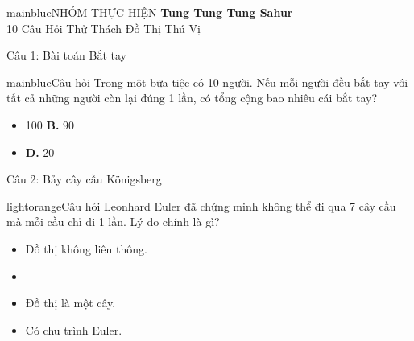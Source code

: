 \documentclass[10pt, xcolor={dvipsnames}]{beamer}
\begin{document}
\begin{frame}[plain]
    \centering
    \vspace{0.4cm}
    \begin{gamebox}{mainblue}{NHÓM THỰC HIỆN}
        \centering \Large \textbf{Tung Tung Tung Sahur} \\
        \vspace{0.2cm}
        \small 10 Câu Hỏi Thử Thách Đồ Thị Thú Vị
    \end{gamebox}
\end{frame}

\begin{frame}{Câu 1: Bài toán Bắt tay}
    \begin{gamebox}{mainblue}{Câu hỏi}
        Trong một bữa tiệc có 10 người. Nếu mỗi người đều bắt tay với tất cả những người còn lại đúng 1 lần, có tổng cộng bao nhiêu cái bắt tay?
    \end{gamebox}
    \begin{itemize}
        \item[\textbf{A.}] 100 \quad \quad \quad \quad \textbf{B.} 90
        \item[\textbf{C.}]  \quad \quad \textbf{D.} 20
    \end{itemize}
\end{frame}

\begin{frame}{Câu 2: Bảy cây cầu Königsberg}
    \begin{gamebox}{lightorange}{Câu hỏi}
        Leonhard Euler đã chứng minh không thể đi qua 7 cây cầu mà mỗi cầu chỉ đi 1 lần. Lý do chính là gì?
    \end{gamebox}
    \begin{itemize}
        \item[\textbf{A.}] Đồ thị không liên thông.
        \item[\textbf{B.}] 
        \item[\textbf{C.}] Đồ thị là một cây.
        \item[\textbf{D.}] Có chu trình Euler.
    \end{itemize}
\end{frame}
\end{document}
